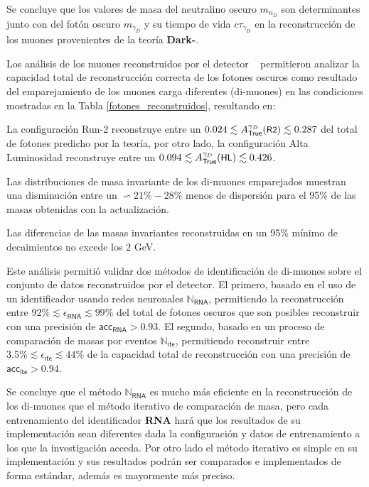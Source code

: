 Se concluye que los valores de masa del neutralino oscuro $m_{n_D}$ son determinantes junto con del fotón oscuro $m_{\gamma_D}$ y su tiempo de vida $c\tau_{\gamma_D}$ en la reconstrucción de los muones provenientes de la teoría \textbf{Dark-}\SUSY.

Los análisis de los muones reconstruidos por el detector \CMS ~ permitieron analizar la capacidad total de reconstrucción correcta de los fotones oscuros como resultado del emparejamiento de los muones carga diferentes (di-muones) en las condiciones mostradas en la Tabla \ref{fotones_reconstruidos}, resultando en:
\begin{itemize_f}
\item La configuración Run-2 reconstruye entre un $0.024\lesssim  A_\textsf{True}^{\gamma_D} (\textsf{\small R2})\lesssim 0.287$ del total de fotones predicho por la teoría, por otro lado, la configuración Alta Luminosidad reconstruye entre un $0.094\lesssim A_\textsf{True}^{\gamma_D} (\textsf{\small HL})\lesssim 0.426$.
\item Las distribuciones de masa invariante de los di-muones emparejados muestran una disminución entre un $\backsim 21\%-28\%$ menos de dispersión para el 95\% de las masas obtenidas con la actualización.
\item Las diferencias de las masas invariantes reconstruidas en un 95\% mínimo de decaimientos no excede los 2 GeV.  
\end{itemize_f}
Este análisis permitió validar dos métodos de identificación de di-muones sobre el conjunto de datos reconstruidos por el detector. El primero, basado en el uso de un identificador usando redes neuronales $\mathbb{N}_\textsf{RNA}$, permitiendo la reconstrucción entre $92\% \lesssim \epsilon_{\textsf{RNA}} \lesssim 99\%$ del total de fotones oscuros que son posibles reconstruir con una precisión de $\textsf{acc}_\textsf{RNA}>0.93$. El segundo, basado en un proceso de comparación de masas por eventos $\mathbb{N}_\textsf{ite}$, permitiendo reconstruir entre $3.5 \% \lesssim \epsilon_{\textsf{ite}}\lesssim 44\%$ de la capacidad total de reconstrucción con una precisión de $\textsf{acc}_\textsf{ite}>0.94$. 

Se concluye que el método $\mathbb{N}_\textsf{RNA}$ es mucho más eficiente en la reconstrucción de los di-muones que el método iterativo de comparación de masa, pero cada entrenamiento del identificador \textbf{RNA} hará que los resultados de su implementación sean diferentes dada la configuración y datos de entrenamiento a los que la investigación acceda. Por otro lado el método iterativo es simple en su implementación y sus resultados podrán ser comparados e implementados de forma estándar, además es mayormente más preciso.

 


